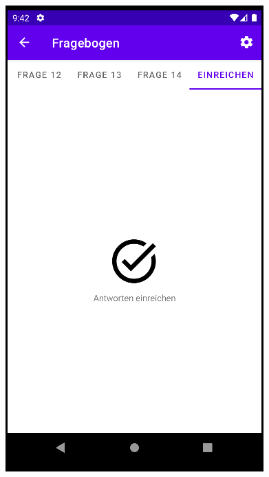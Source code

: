 \documentclass[ngerman]{tutorial}
\begin{document}
\begin{center}
    \includegraphics[scale=0.45]{survey_end.png}
\end{center}



\newpage
\end{document}
